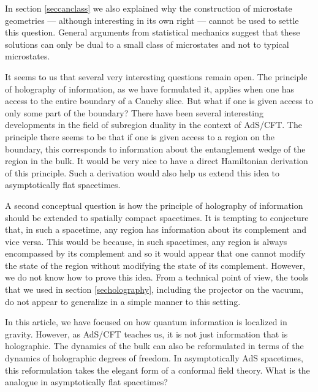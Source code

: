 \documentclass[12pt]{article}
\begin{document}
In section \ref{seccanclass} we also explained  why the construction of microstate geometries --- although interesting in its own right --- cannot be used to settle this question. General arguments from statistical mechanics suggest that these solutions can only be dual to a small class of microstates and not to typical microstates.

It seems to us that several very interesting questions remain open. The principle of holography of information, as we have formulated it, applies when one has access to the entire boundary of a Cauchy slice. But what if one is given access to only some part of the boundary? There have been several interesting developments in the field of subregion duality in the context of AdS/CFT. The principle there seems to be that if one is given access to a region on the boundary, this corresponds to information about the entanglement wedge of the region in the bulk. It would be very nice to have a direct Hamiltonian derivation of this principle. Such a derivation would also help us extend this idea to asymptotically flat spacetimes.

A second conceptual question is how the principle of holography of information should be extended to spatially compact spacetimes. It is tempting to conjecture that, in such a spacetime, any region has information about its complement and vice versa. This would be because, in such spacetimes, any region is always encompassed by its complement  and so it would appear that one cannot modify the state of the region without modifying the state of its complement. However, we do not know how to prove this idea. From a technical point of view, the tools that we used in section \ref{secholography}, including the projector on the vacuum, do not appear to generalize in a simple manner to this setting.

In this article, we have focused on how quantum information is localized in gravity. However, as AdS/CFT teaches us, it is not just information that is holographic. The dynamics of the bulk can also be reformulated in terms of the dynamics of holographic degrees of freedom. In asymptotically AdS spacetimes, this reformulation takes the elegant form of a conformal field theory. What is the analogue in asymptotically flat spacetimes?
\end{document}
